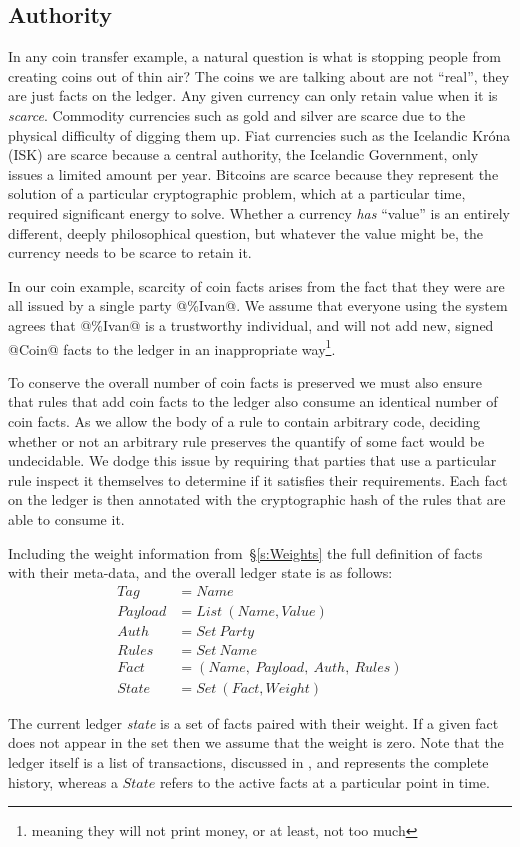 \subsection{Authority}
In any coin transfer example, a natural question is what is stopping people from creating coins out of thin air? The coins we are talking about are not ``real'', they are just facts on the ledger. Any given currency can only retain value when it is \emph{scarce}. Commodity currencies such as gold and silver are scarce due to the physical difficulty of digging them up. Fiat currencies such as the Icelandic Kr\'ona (ISK) are scarce because a central authority, the Icelandic Government, only issues a limited amount per year. Bitcoins are scarce because they represent the solution of a particular cryptographic problem, which at a particular time, required significant energy to solve. Whether a currency \emph{has} ``value'' is an entirely different, deeply philosophical question, but whatever the value might be, the currency needs to be scarce to retain it.

In our coin example, scarcity of coin facts arises from the fact that they were are all issued by a single party @\%Ivan@. We assume that everyone using the system agrees that @\%Ivan@ is a trustworthy individual, and will not add new, signed @Coin@ facts to the ledger in an inappropriate way\footnote{meaning they will not print money, or at least, not too much}.

To conserve the overall number of coin facts is preserved we must also ensure that rules that add coin facts to the ledger also consume an identical number of coin facts. As we allow the body of a rule to contain arbitrary code, deciding whether or not an arbitrary rule preserves the quantify of some fact would be undecidable. We dodge this issue by requiring that parties that use a particular rule inspect it themselves to determine if it satisfies their requirements. Each fact on the ledger is then annotated with the cryptographic hash of the rules that are able to consume it.

\eject
Including the weight information from~\S\ref{s:Weights} the full definition of facts with their meta-data, and the overall ledger state is as follows:
$$
\begin{array}{ll}
   Tag     & = Name
\\ Payload & = List~ (Name, Value)
\\ Auth    & = Set~ Party
\\ Rules   & = Set~ Name
\\ Fact    & = (Name,~ Payload,~ Auth,~ Rules)
\\ State   & = Set~ (Fact, Weight)
\end{array}
$$

The current ledger \emph{state} is a set of facts paired with their weight. If a given fact does not appear in the set then we assume that the weight is zero. Note that the ledger itself is a list of transactions, discussed in \REF, and represents the complete history, whereas a $State$ refers to the active facts at a particular point in time.
